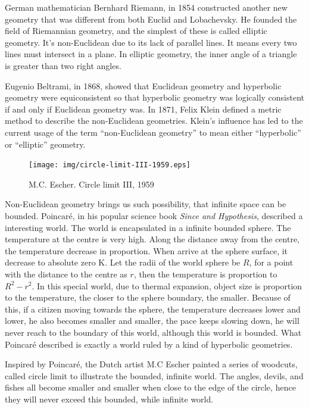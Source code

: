 \documentclass{article}
\begin{document}
German mathematician Bernhard Riemann, in 1854 constructed another new geometry that was different from both Euclid and Lobachevsky. He founded the field of Riemannian geometry, and the simplest of these is called elliptic geometry. It's non-Euclidean due to its lack of parallel lines. It means every two lines must intersect in a plane. In elliptic geometry, the inner angle of a triangle is greater than two right angles.

Eugenio Beltrami, in 1868, showed that Euclidean geometry and hyperbolic geometry were equiconsistent so that hyperbolic geometry was logically consistent if and only if Euclidean geometry was. In 1871, Felix Klein defined a metric method to describe the non-Euclidean geometries. Klein's influence has led to the current usage of the term ``non-Euclidean geometry'' to mean either ``hyperbolic'' or ``elliptic'' geometry.

\begin{figure}[htbp]
 \centering
 \texttt{[image: img/circle-limit-III-1959.eps]}
 \captionsetup{labelformat=empty}
 \caption{M.C. Escher. Circle limit III, 1959}
 \label{fig:circle-limit-3}
\end{figure}

Non-Euclidean geometry brings us such possibility, that infinite space can be bounded. Poincaré, in his popular science book {\em Since and Hypothesis}, described a interesting world. The world is encapsulated in a infinite bounded sphere. The temperature at the centre is very high. Along the distance away from the centre, the temperature decrease in proportion. When arrive at the sphere surface, it decrease to absolute zero K. Let the radii of the world sphere be $R$, for a point with the distance to the centre as $r$, then the temperature is proportion to $R^2 - r^2$. In this special world, due to thermal expansion, object size is proportion to the temperature, the closer to the sphere boundary, the smaller. Because of this, if a citizen moving towards the sphere, the temperature decreases lower and lower, he also becomes smaller and smaller, the pace keeps slowing down, he will never reach to the boundary of this world, although this world is bounded. What Poincaré described is exactly a world ruled by a kind of hyperbolic geometries.

Inspired by Poincaré, the Dutch artist M.C Escher painted a series of woodcuts, called circle limit to illustrate the bounded, infinite world. The angles, devils, and fishes all become smaller and smaller when close to the edge of the circle, hence they will never exceed this bounded, while infinite world.
\end{document}
